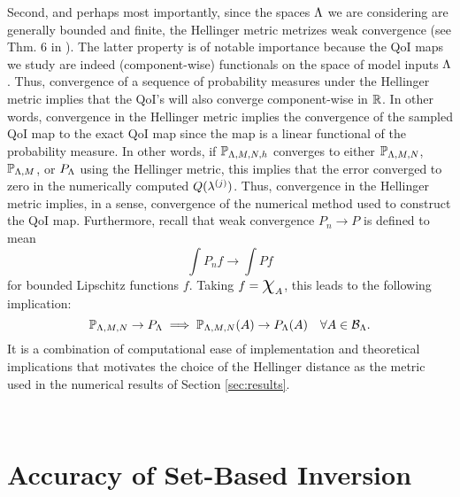 Second, and perhaps most importantly, since the spaces ${\Lambda}$ we are considering are generally bounded and finite, the Hellinger metric metrizes weak convergence (see Thm. 6 in \cite{GS02}).
The latter property is of notable importance because the QoI maps we study are indeed (component-wise) functionals on the space of model inputs ${\Lambda}$. 
Thus, convergence of a sequence of probability measures under the Hellinger metric implies that the QoI's will also converge component-wise in $\mathbb{R}$. 
In other words, convergence in the Hellinger metric implies the convergence of the sampled QoI map to the exact QoI map since the map is a linear functional of the probability measure. 
In other words, if $\mathbb{P}_{{\Lambda},M,N,h}$ converges to either $\mathbb{P}_{{\Lambda},M,N}$, $\mathbb{P}_{{\Lambda},M}$, or $P_{\Lambda}$ using the Hellinger metric, this implies that the error converged to zero in the numerically computed $Q(\lambda^{(j)})$.
Thus, convergence in the Hellinger metric implies, in a sense, convergence of the numerical method used to construct the QoI map. 
Furthermore, recall that weak convergence $P_n \to P$ is defined to mean 
\[
\int P_n f \to \int Pf
\]
for bounded Lipschitz functions $f$. 
Taking $f = \Chi_A$, this leads to the following implication:  
\[
\mathbb{P}_{{\Lambda}, M, N} \to P_{\Lambda} \implies \mathbb{P}_{{\Lambda}, M, N} (A) \to P_{\Lambda} (A) \quad \forall{A\in\mathcal{B}_{{\Lambda}}}.
\]
It is a combination of computational ease of implementation and theoretical implications that motivates the choice of the Hellinger distance as the metric used in the numerical results of Section \ref{sec:results}.



\
\section{Accuracy of Set-Based Inversion}



